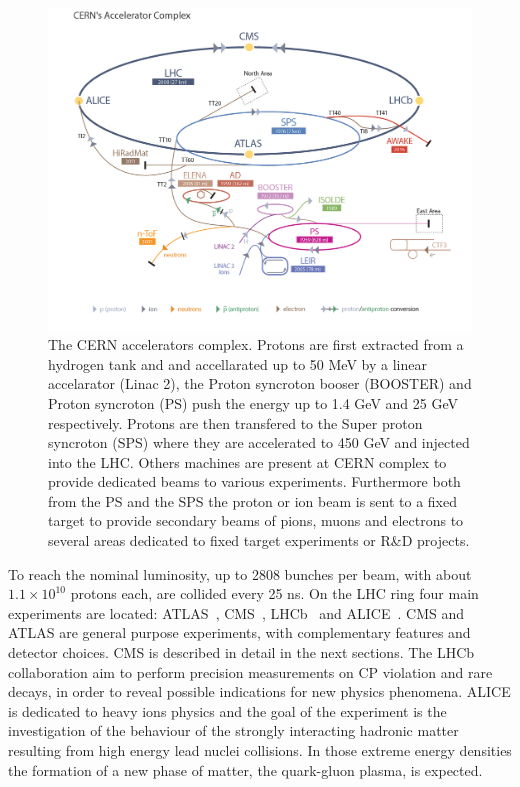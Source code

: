 \begin{figure}[!h]
  \includegraphics[width = 1.\textwidth]{figures/cms/LHC_accelarator_complex.jpg}
  \caption{The CERN accelerators complex. Protons are first extracted from a hydrogen tank and and accellarated up to 50 MeV by
    a linear accelarator (Linac 2), the Proton syncroton booser (BOOSTER) and Proton syncroton (PS) push the energy up to
    1.4 GeV and 25 GeV respectively. Protons are then transfered to the Super proton syncroton (SPS) where they are accelerated to
    450 GeV and injected into the LHC. Others machines are present at CERN complex to provide dedicated beams to various experiments.
    Furthermore both from the PS and the SPS the proton or ion beam is sent to a fixed target to provide secondary beams of pions, muons and electrons to several areas dedicated to fixed target experiments or R\&D projects. 
  }
  \label{fig:lhc_chain}  
\end{figure}

To reach the nominal luminosity, up to 2808 bunches per beam, with about $1.1\times 10^{10}$
protons each, are collided every 25 ns.
On the LHC ring four main experiments are located: ATLAS~\cite{atlas}, CMS~\cite{cms}, LHCb~\cite{lhcb} and
ALICE~\cite{alice}. CMS and ATLAS are general purpose experiments, with complementary features
and detector choices. CMS is described in detail in the next sections. The LHCb collaboration
aim to perform precision measurements on CP violation and rare decays, in order to reveal
possible indications for new physics phenomena. ALICE is dedicated to heavy ions physics and the
goal of the experiment is the investigation of the behaviour of the strongly interacting hadronic
matter resulting from high energy lead nuclei collisions. In those extreme energy densities the
formation of a new phase of matter, the quark-gluon plasma, is expected.

